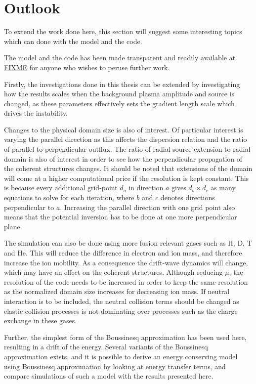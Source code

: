 \section*{Outlook}
%
To extend the work done here, this section will suggest some interesting topics which can done with the model and the code.

The model and the code has been made transparent and readily available at \href{FIXME}{FIXME} for anyone who wishes to peruse further work.

Firstly, the investigations done in this thesis can be extended by investigating how the results scales when the background plasma amplitude and source is changed, as these parameters effectively sets the gradient length scale which drives the instability.

Changes to the physical domain size is also of interest.
Of particular interest is varying the parallel direction as this affects the dispersion relation and the ratio of parallel to perpendicular outflux.
The ratio of radial source extension to radial domain is also of interest in order to see how the perpendicular propagation of the coherent structures changes.
It should be noted that extensions of the domain will come at a higher computational price if the resolution is kept constant.
This is because every additional grid-point $d_a$ in direction $a$ gives $d_b\times d_c$ as many equations to solve for each iteration, where $b$ and $c$ denotes directions perpendicular to $a$.
Increasing the parallel direction with one grid point also means that the potential inversion has to be done at one more perpendicular plane.

The simulation can also be done using more fusion relevant gases such as $\text{H}$, $\text{D}$, $\text{T}$ and $\text{He}$.
This will reduce the difference in electron and ion mass, and therefore increase the ion mobility.
As a consequence the drift-wave dynamics will change, which may have an effect on the coherent structures.
Although reducing $\mu$, the resolution of the code needs to be increased in order to keep the same resolution as the normalized domain size increases for decreasing ion mass.
If neutral interaction is to be included, the neutral collision terms should be changed as elastic collision processes is not dominating over processes such as the charge exchange in these gases.

Further, the simplest form of the Boussinesq approximation has been used here, resulting in a drift of the energy.
Several variants of the Boussinesq approximation exists, and it is possible to derive an energy conserving model using Boussinesq approximation by looking at energy transfer terms, and compare simulations of such a model with the results presented here.

